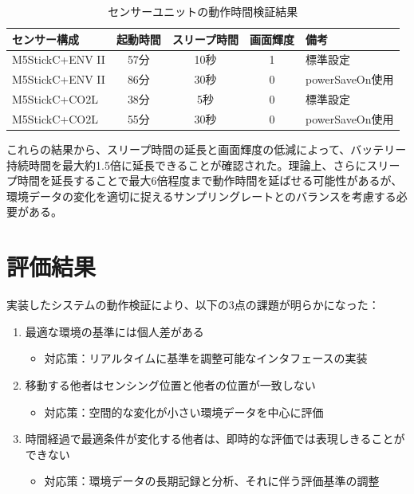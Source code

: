 \documentclass{cuxarticle}
\begin{document}
\begin{table}[htbp]
  \caption{センサーユニットの動作時間検証結果}
  \label{table:battery}
  \centering
  \begin{tabular}{|l|c|c|c|l|}
    \hline
    センサー構成 & 起動時間 & スリープ時間 & 画面輝度 & 備考 \\
    \hline
    M5StickC+ENV II & 57分 & 10秒 & 1 & 標準設定 \\
    \hline
    M5StickC+ENV II & 86分 & 30秒 & 0 & powerSaveOn使用 \\
    \hline
    M5StickC+CO2L & 38分 & 5秒 & 0 & 標準設定 \\
    \hline
    M5StickC+CO2L & 55分 & 30秒 & 0 & powerSaveOn使用 \\
    \hline
  \end{tabular}
\end{table}

これらの結果から、スリープ時間の延長と画面輝度の低減によって、バッテリー持続時間を最大約1.5倍に延長できることが確認された。理論上、さらにスリープ時間を延長することで最大6倍程度まで動作時間を延ばせる可能性があるが、環境データの変化を適切に捉えるサンプリングレートとのバランスを考慮する必要がある。

\section{評価結果}
実装したシステムの動作検証により、以下の3点の課題が明らかになった：

\begin{enumerate}
  \item 最適な環境の基準には個人差がある
    \begin{itemize}
      \item 対応策：リアルタイムに基準を調整可能なインタフェースの実装
    \end{itemize}

  \item 移動する他者はセンシング位置と他者の位置が一致しない
    \begin{itemize}
      \item 対応策：空間的な変化が小さい環境データを中心に評価
    \end{itemize}

  \item 時間経過で最適条件が変化する他者は、即時的な評価では表現しきることができない
    \begin{itemize}
      \item 対応策：環境データの長期記録と分析、それに伴う評価基準の調整
    \end{itemize}
\end{enumerate}
\end{document}
